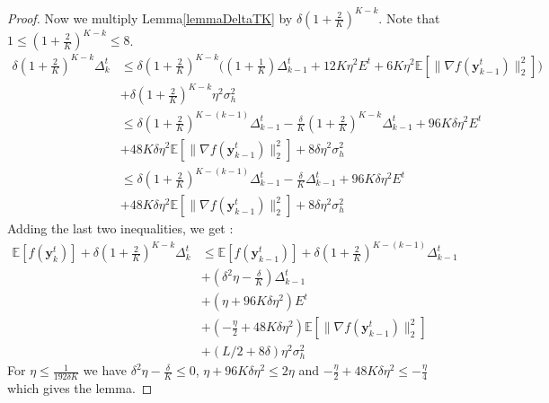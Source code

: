 \documentclass[10pt,a4paper]{amsart}
\newcommand{\E}{\mathbb{E}}
\newcommand{\norm}[1]{\|#1\|_2}
\def\vy{{\bm{y}}}
\begin{document}
\begin{proof}
Now we multiply Lemma\ref{lemmaDeltaTK} by $\delta (1 + \frac{2}{K})^{K-k}$. Note that $1 \leq (1 + \frac{2}{K})^{K-k}\leq 8$.
\begin{align*}
    \delta (1 + \frac{2}{K})^{K-k}\Delta^t_k &\leq \delta (1 + \frac{2}{K})^{K-k}\big((1+\frac{1}{K})\Delta^t_{k-1} + 12 K\eta^2 E^t + 6K\eta^2\E[\norm{\nabla f(\vy^t_{k-1})}^2]\big)\\&+ \delta (1 + \frac{2}{K})^{K-k}\eta^2\sigma_h^2\\
    &\leq \delta (1 + \frac{2}{K})^{K-(k-1)}\Delta^t_{k-1} - \frac{\delta}{K}(1 + \frac{2}{K})^{K-k}\Delta^t_{k-1} + 96 K\delta\eta^2E^t \\&+ 48 K\delta\eta^2\E[\norm{\nabla f(\vy^t_{k-1})}^2]+ 8\delta\eta^2\sigma_h^2\\
    &\leq \delta (1 + \frac{2}{K})^{K-(k-1)}\Delta^t_{k-1} - \frac{\delta}{K}\Delta^t_{k-1} + 96 K\delta\eta^2E^t\\& + 48 K\delta\eta^2\E[\norm{\nabla f(\vy^t_{k-1})}^2]+ 8\delta\eta^2\sigma_h^2
\end{align*}
Adding the last two inequalities, we get :
\begin{align*}
    \E[f(\vy^t_k)] + \delta (1 + \frac{2}{K})^{K-k}\Delta^t_k &\leq \E[f(\vy^t_{k-1})] + \delta (1 + \frac{2}{K})^{K-(k-1)}\Delta^t_{k-1} \\&+(\delta^2 \eta- \frac{\delta}{K})\Delta^t_{k-1} \\&+ (\eta+ 96 K\delta\eta^2)E^t \\&+ (- \frac{\eta}{2}+48 K\delta\eta^2)\E[\norm{\nabla f(\vy^t_{k-1})}^2]\\&+ (L/2 + 8\delta)\eta^2\sigma_h^2
\end{align*}
For $\eta\leq \frac{1}{192\delta K}$ we have $\delta^2 \eta- \frac{\delta}{K}\leq 0$, $\eta+ 96 K\delta\eta^2\leq 2\eta$ and $- \frac{\eta}{2}+48 K\delta\eta^2\leq - \frac{\eta}{4}$ which gives the lemma.
\end{proof}
\end{document}
